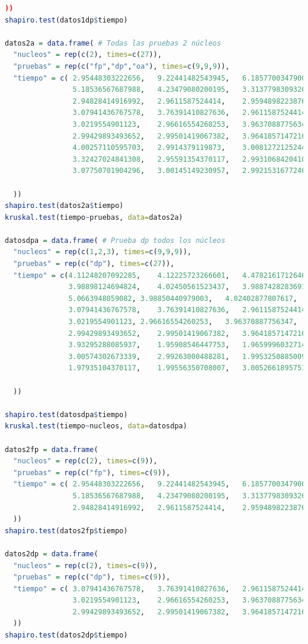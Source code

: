 \documentclass{article}
\begin{document}
\begin{lstlisting}[language=R]
  ))
shapiro.test(datos1dp$tiempo)

datos2a = data.frame( # Todas las pruebas 2 núcleos
  "nucleos" = rep(c(2), times=c(27)),
  "pruebas" = rep(c("fp","dp","oa"), times=c(9,9,9)),
  "tiempo" = c( 2.95448303222656,	9.22441482543945,	6.18577003479003,
                5.18536567687988,	4.23479080200195,	3.31377983093261,
                2.94828414916992,	2.9611587524414,	2.95948982238769,
                3.07941436767578,	3.76391410827636,	2.9611587524414,
                3.0219554901123,	2.96616554260253,	3.96370887756347,
                2.99429893493652,	2.99501419067382,	3.96418571472167,
                4.00257110595703,	2.9914379119873,	3.00812721252441,
                3.32427024841308,	2.95591354370117,	2.99310684204101,	
                3.07750701904296,	3.00145149230957,	2.9921531677246

  ))
shapiro.test(datos2a$tiempo)
kruskal.test(tiempo~pruebas, data=datos2a)

datosdpa = data.frame( # Prueba dp todos los núcleos
  "nucleos" = rep(c(1,2,3), times=c(9,9,9)),
  "pruebas" = rep(c("dp"), times=c(27)),
  "tiempo" = c(4.11248207092285,	4.12225723266601,	4.47821617126464,	
               3.98898124694824,	4.02450561523437,	3.98874282836914,	
               5.0663948059082,	3.98850440979003,	4.02402877807617, 
               3.07941436767578,	3.76391410827636,	2.9611587524414,	
               3.0219554901123,	2.96616554260253,	3.96370887756347,	
               2.99429893493652,	2.99501419067382,	3.96418571472167, 
               3.93295288085937,	1.95908546447753,	1.96599960327148,	
               3.00574302673339,	2.99263000488281,	1.99532508850097,	
               1.97935104370117,	1.99556350708007,	3.00526618957519
               
  ))

shapiro.test(datosdpa$tiempo)
kruskal.test(tiempo~nucleos, data=datosdpa)

datos2fp = data.frame(
  "nucleos" = rep(c(2), times=c(9)),
  "pruebas" = rep(c("fp"), times=c(9)),
  "tiempo" = c(	2.95448303222656,	9.22441482543945,	6.18577003479003,	
                5.18536567687988,	4.23479080200195,	3.31377983093261,
                2.94828414916992,	2.9611587524414,	2.95948982238769
  ))
shapiro.test(datos2fp$tiempo)

datos2dp = data.frame(
  "nucleos" = rep(c(2), times=c(9)),
  "pruebas" = rep(c("dp"), times=c(9)),
  "tiempo" = c(	3.07941436767578,	3.76391410827636,	2.9611587524414,
                3.0219554901123,	2.96616554260253,	3.96370887756347,	
                2.99429893493652,	2.99501419067382,	3.96418571472167
  ))
shapiro.test(datos2dp$tiempo)


\end{lstlisting}
\end{document}
